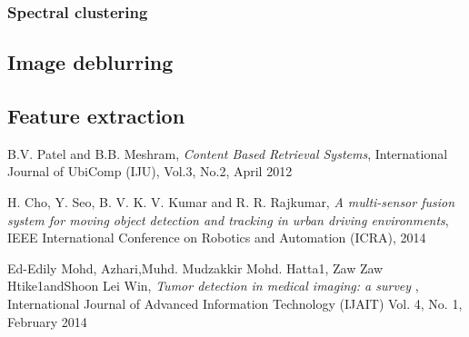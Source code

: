 \documentclass[11pt]{article}
\begin{document}
\subsubsection{Spectral clustering}


\subsection{Image deblurring}
\subsection{Feature extraction}


\begin{thebibliography}{9}
	
	B.V. Patel and B.B. Meshram,
	\textit{Content Based Retrieval Systems},
	International Journal of UbiComp (IJU), Vol.3, No.2, 
	April 2012
	
	H. Cho, Y. Seo, B. V. K. V. Kumar and R. R. Rajkumar, 
	\textit{A multi-sensor fusion system for moving object detection and tracking in urban driving environments}, 
	IEEE International Conference on Robotics and Automation (ICRA), 
	2014

	Ed-Edily Mohd,  Azhari,Muhd. Mudzakkir Mohd. Hatta1, Zaw Zaw Htike1andShoon Lei Win, 
	\textit{Tumor detection in medical imaging: a survey }, 
	International Journal of Advanced Information Technology (IJAIT) Vol. 4, No. 1, 
	February 2014
	
	
	
\end{thebibliography}
\end{document}
